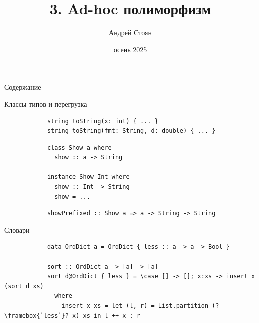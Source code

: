 
\newif\ifhandout




\title[3. Ad-hoc полиморфизм]{3. Ad-hoc полиморфизм}
\author{Андрей Стоян}

\date{осень 2025}



    \mymaketitle

    \begin{frame}[noframenumbering]{Содержание}
        \tableofcontents
    \end{frame}

    \begin{frame}[fragile]{Классы типов и перегрузка}
        \pause
        \begin{verbatim}
            string toString(x: int) { ... }
            string toString(fmt: String, d: double) { ... }
        \end{verbatim}
        \pause\vspace{1em}
        \begin{verbatim}
            class Show a where
              show :: a -> String

            instance Show Int where
              show :: Int -> String
              show = ...
        \end{verbatim}
        \pause\vspace{1em}
        \begin{verbatim}
            showPrefixed :: Show a => a -> String -> String
        \end{verbatim}
    \end{frame}


    \begin{frame}[fragile]{Словари}
        \pause
        \begin{verbatim}
            data OrdDict a = OrdDict { less :: a -> a -> Bool }

            sort :: OrdDict a -> [a] -> [a]
            sort d@OrdDict { less } = \case [] -> []; x:xs -> insert x (sort d xs)
              where
                insert x xs = let (l, r) = List.partition (?\framebox{`less`}? x) xs in l ++ x : r
        \end{verbatim}
    \end{frame}

